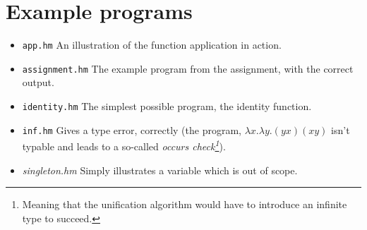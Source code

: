 \documentclass[a4paper]{article}
\begin{document}
\section{Example programs}

\begin{itemize}
    \item \texttt{app.hm} An illustration of the function application in action. 
    \item \texttt{assignment.hm} The example program from the assignment, with
        the correct output. 
    \item \texttt{identity.hm} The simplest possible program, the identity
        function. 
    \item \texttt{inf.hm} Gives a type error, correctly (the program, $\lambda
        x.
        \lambda y . (y x) (x y)$ isn't typable and leads to a so-called
        \emph{occurs check\footnote{Meaning that the unification algorithm would
        have to introduce an infinite type to succeed.}}).
    \item \textit{singleton.hm} Simply illustrates a variable which is out of
        scope. 
\end{itemize}
\end{document}

